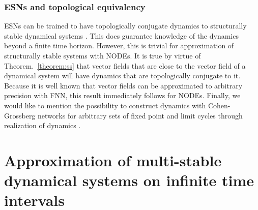 \documentclass{article}
\theoremstyle{definition} \newtheorem{definition}{Definition}
\theoremstyle{remark} \newtheorem{remark}{Remark}
\newcounter{ct}
\begin{document}
\citep{williams2024expressivity}



\subsubsection{ESNs and topological equivalency}%
ESNs can be trained to have  topologically conjugate dynamics to structurally stable dynamical systems \citep{hart2020embedding}.
This does guarantee knowledge of the dynamics beyond a finite time horizon.
However, this is trivial for approximation of structurally stable systems with NODEs.
It is true by virtue of Theorem.~\ref{theorem:ss} that vector fields that are close to the vector field of a dynamical system will have dynamics that are topologically conjugate to it.
Because it is well known that vector fields can be approximated to arbitrary precision with FNN, this result immediately follows for NODEs.
Finally, we would like to mention the possibility to construct dynamics with Cohen-Grossberg networks for arbitrary sets of fixed point and limit cycles through realization of dynamics \citep{cohen1992construction}.



\section{Approximation of multi-stable dynamical systems on infinite time intervals}
\end{document}
